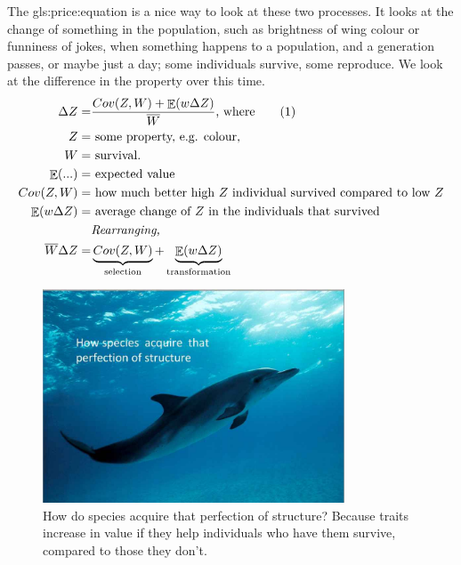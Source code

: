 \documentclass[]{article}
\newcommand\numberthis{\addtocounter{equation}{1}\tag{\theequation}}
\begin{document}
The \gls{gls:price:equation}\cite{gardner2020price,price1970selection,frank2012natural} is a nice way to look at these two processes. It looks at the change of something in the population, such as brightness of wing colour or funniness of jokes,  when something happens to a population, and a generation passes, or maybe just a day; some individuals survive, some reproduce. We look at the difference in the property over this time.
\begin{align*}
	\Delta Z =& \frac{Cov(Z,W) + \mathop{\mathbb{E}}(w \Delta Z)}{\overline {W}}\text{, where} \numberthis \label{eq:price:equation}\\
	Z=& \text{ some property, e.g. colour,}\\
	W=& \text{ survival.}\\
	\mathop{\mathbb{E}}(...) =& \text{ expected value}\\
	Cov(Z,W)=&\text{ how much better high $Z$ individual survived compared to low $Z$}\\
	\mathop{\mathbb{E}}(w \Delta Z)=&\text{ average change of $Z$ in the individuals that survived}\\
	 & \textit{Rearranging, }\\
	\overline{W} \Delta Z =& \underbrace{Cov(Z,W)}_\text{selection} + \underbrace{\mathop{\mathbb{E}}(w \Delta Z)}_\text{transformation}
\end{align*}

\begin{figure}[H]
	\begin{center}
		\caption[How do species acquire that perfection of structure? ]{How do species acquire that perfection of structure? Because traits increase in value if they help individuals who have them survive, compared to those they don't.}
		\includegraphics[width=0.8\textwidth]{dolphin}
	\end{center}
\end{figure}
\end{document}
